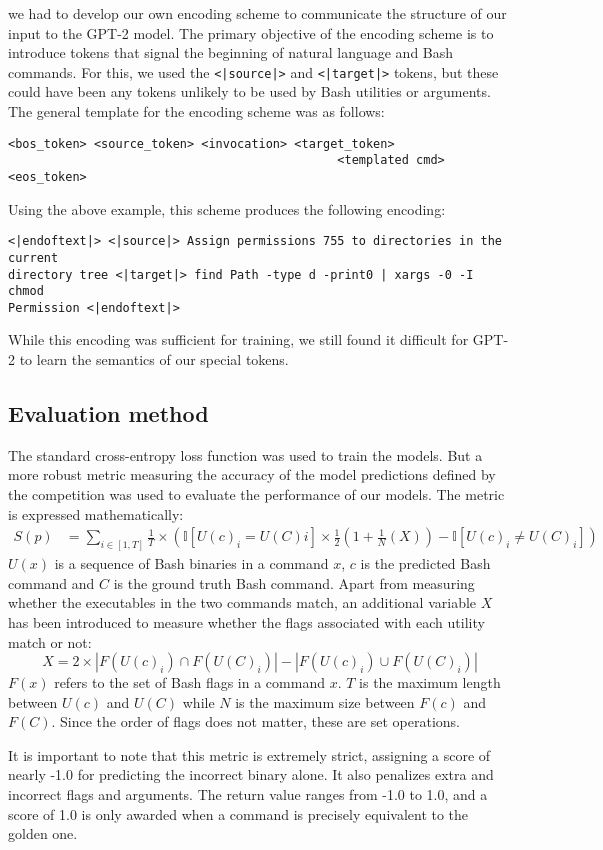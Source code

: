 we had to develop our own encoding scheme to communicate the structure of our
input to the GPT-2 model. The primary objective of the encoding scheme is to
introduce tokens that signal the beginning of natural language and Bash commands. For this, we used the \texttt{<|source|>} and \texttt{<|target|>} tokens, but these could have been any tokens unlikely to be used by Bash utilities or arguments. The general template for the encoding scheme was as follows:
\begin{verbatim}
<bos_token> <source_token> <invocation> <target_token>
                                              <templated cmd> <eos_token> 
\end{verbatim}
Using the above example, this scheme produces the following encoding:
\begin{verbatim}
<|endoftext|> <|source|> Assign permissions 755 to directories in the current
directory tree <|target|> find Path -type d -print0 | xargs -0 -I chmod 
Permission <|endoftext|>
\end{verbatim}
While this encoding was sufficient for training, we still found it difficult
for GPT-2 to learn the semantics of our special tokens.


\subsection{Evaluation method}
The standard cross-entropy loss function was used to train the models. But a
more robust metric measuring the accuracy of the model predictions defined by
the competition was used to evaluate the performance of our models. The metric
is expressed mathematically:
\begin{align*}
	S(p) & =\sum_{i\in[1,T]}\frac{1}{T}\times\left(
	\mathbb{I}[U(c)_i=U(C)i]\times\frac{1}{2}\left(
		1+\frac{1}{N}\left(X\right)\right) -\mathbb{I}[U(c)_i\ne U(C)_i]
	\right)
\end{align*}
$U(x)$ is a sequence of Bash binaries in a command $x$, $c$ is the
predicted Bash command and $C$ is the ground truth Bash command. Apart from
measuring whether the executables in the two commands match, an additional
variable $X$ has been introduced to measure whether the flags associated with
each utility match or not:
\begin{equation*}
	X = 2\times
	|F(U(c)_i)\cap F(U(C)_i)| - |F(U(c)_i)\cup F(U(C)_i)|
\end{equation*}
$F(x)$ refers to the set of Bash flags in a command $x$. $T$ is the
maximum length between $U(c)$ and $U(C)$ while $N$ is the maximum size between
$F(c)$ and $F(C)$. Since the order of flags does not matter, these are set
operations.
\par
It is important to note that this metric is extremely strict, assigning a score
of nearly -1.0 for predicting the incorrect binary alone. It also penalizes
extra and incorrect flags and arguments. The return value ranges from -1.0 to
1.0, and a score of 1.0 is only awarded when a command is precisely equivalent
to the golden one.
